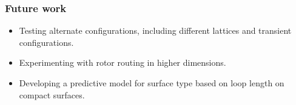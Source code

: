 \documentclass{beamer}
\begin{document}

\begin{frame}
	\frametitle{Future work}
	
	\begin{itemize}
		\item Testing alternate configurations, including different lattices and transient configurations.
		\item Experimenting with rotor routing in higher dimensions.
		\item Developing a predictive model for surface type based on loop length on compact surfaces.
	\end{itemize}

\end{frame}
 
\end{document}

